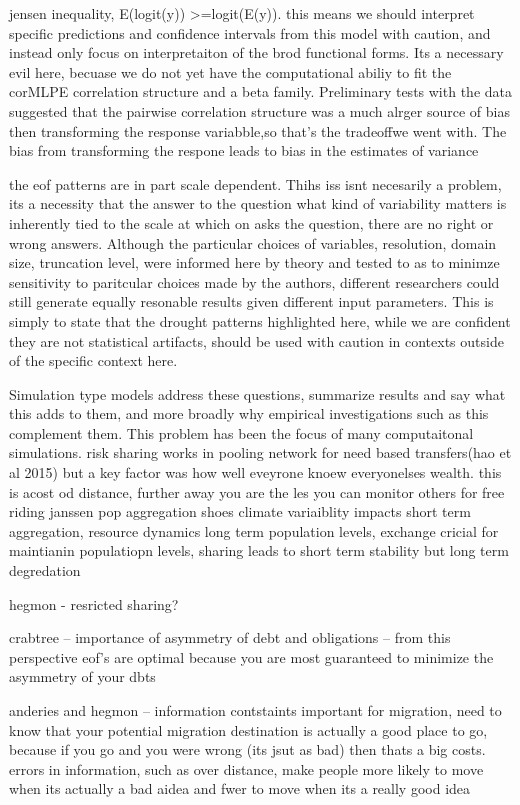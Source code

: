 \documentclass[fleqn,10pt]{wlscirep}
\begin{document}
jensen inequality, E(logit(y)) >=logit(E(y)). this means we should interpret specific predictions and confidence intervals from this model with caution, and instead only focus on interpretaiton of the brod functional forms. Its a necessary evil here, becuase we do not yet have the computational abiliy to fit the corMLPE correlation structure and a beta family. Preliminary tests with the data suggested that the pairwise correlation structure was a much alrger source of bias then transforming the response variabble,so that's the tradeoffwe went with. The bias from transforming the respone leads to bias in the estimates of variance

the eof patterns are in part scale dependent. Thihs iss isnt necesarily a problem, its a necessity that the answer to the question what kind of variability matters is inherently tied to the scale at which on asks the question, there are no right or wrong answers. Although the particular choices of variables, resolution, domain size, truncation level, were informed here by theory and tested to as to minimze sensitivity to paritcular choices made by the authors, different researchers could still generate equally resonable results given  different input parameters.  This is simply to state that the drought patterns highlighted here, while we are confident they are not statistical artifacts, should be used with caution in contexts outside of the specific context here.

Simulation type models address these questions, summarize results and say what this adds to them, and more broadly why empirical investigations such as this complement them.
This problem has been the focus of many computaitonal simulations. risk sharing works in pooling network for need based transfers(hao et al 2015) but a key factor was how well eveyrone knoew everyonelses wealth. this is acost od distance, further away you are the les you can monitor others for free riding
janssen pop aggregation shoes climate variaiblity impacts short term aggregation, resource dynamics long term population levels, exchange cricial for maintianin populatiopn levels, sharing leads to short term stability but long term degredation

hegmon - resricted sharing?

crabtree -- importance of asymmetry of debt and obligations -- from this perspective eof's are optimal because you are most guaranteed to minimize the asymmetry of your dbts

anderies and hegmon -- information contstaints important for migration, need to know that your potential migration destination is actually a good place to go, because if you go and you were wrong (its jsut as bad) then thats a big costs. errors in information, such as over distance, make people more likely to move when its actually a bad aidea and fwer to move when its a really good idea
\end{document}

